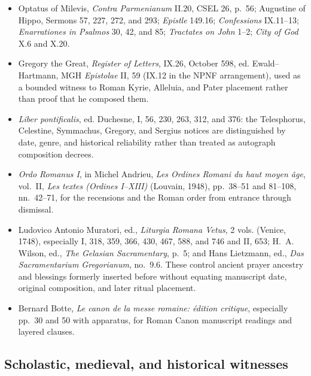 \begin{itemize}
  \item Optatus of Milevis, \emph{Contra Parmenianum} II.20, CSEL 26, p.~56; Augustine of Hippo, Sermons 57, 227, 272, and 293; \emph{Epistle} 149.16; \emph{Confessions} IX.11--13; \emph{Enarrationes in Psalmos} 30, 42, and 85; \emph{Tractates on John} 1--2; \emph{City of God} X.6 and X.20.
  \item Gregory the Great, \emph{Register of Letters}, IX.26, October 598, ed. Ewald--Hartmann, MGH \emph{Epistolae} II, 59 (IX.12 in the NPNF arrangement), used as a bounded witness to Roman Kyrie, Alleluia, and Pater placement rather than proof that he composed them.
  \item \emph{Liber pontificalis}, ed. Duchesne, I, 56, 230, 263, 312, and 376: the Telesphorus, Celestine, Symmachus, Gregory, and Sergius notices are distinguished by date, genre, and historical reliability rather than treated as autograph composition decrees.
  \item \emph{Ordo Romanus I}, in Michel Andrieu, \emph{Les Ordines Romani du haut moyen âge}, vol.~II, \emph{Les textes (Ordines I--XIII)} (Louvain, 1948), pp.~38--51 and 81--108, nn.~42--71, for the recensions and the Roman order from entrance through dismissal.
  \item Ludovico Antonio Muratori, ed., \emph{Liturgia Romana Vetus}, 2 vols. (Venice, 1748), especially I, 318, 359, 366, 430, 467, 588, and 746 and II, 653; H.~A. Wilson, ed., \emph{The Gelasian Sacramentary}, p.~5; and Hans Lietzmann, ed., \emph{Das Sacramentarium Gregorianum}, no.~9.6. These control ancient prayer ancestry and blessings formerly inserted before  without equating manuscript date, original composition, and later ritual placement.
  \item Bernard Botte, \emph{Le canon de la messe romaine: édition critique}, especially pp.~30 and 50 with apparatus, for Roman Canon manuscript readings and layered clauses.
\end{itemize}

\subsection{Scholastic, medieval, and historical witnesses}

